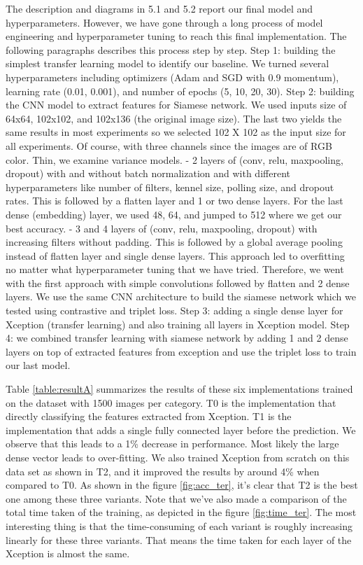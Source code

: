 The description and diagrams in 5.1 and 5.2 report our final model and hyperparameters. However, we have gone through a long process of model engineering and hyperparameter tuning to reach this final implementation. The following paragraphs describes this process step by step.
Step 1: building the simplest transfer learning model to identify our baseline. We turned several hyperparameters including optimizers (Adam and SGD with 0.9 momentum), learning rate (0.01, 0.001), and number of epochs (5, 10, 20, 30).
Step 2: building the CNN model to extract features for Siamese network. We used inputs size of 64x64, 102x102, and 102x136 (the original image size). The last two yields the same results in most experiments so we selected 102 X 102 as the input size for all experiments. Of course, with three channels since the images are of RGB color. Thin, we examine variance models.
- 2 layers of (conv, relu, maxpooling, dropout) with and without batch normalization and with different hyperparameters like number of filters, kennel size, polling size, and dropout rates. This is followed by a flatten layer and 1 or two dense layers. For the last dense (embedding) layer, we used 48, 64, and jumped to 512 where we get our best accuracy.
- 3 and 4 layers of (conv, relu, maxpooling, dropout) with increasing filters without padding. This is followed by a global average pooling instead of flatten layer and single dense layers. This approach led to overfitting no matter what hyperparameter tuning that we have tried.
Therefore, we went with the first approach with simple convolutions followed by flatten and 2 dense layers. We use the same CNN architecture to build the siamese network which we tested using contrastive and triplet loss.
Step 3: adding a single dense layer for Xception (transfer learning) and also training all layers in  Xception model.
Step 4: we combined transfer learning with siamese network by adding 1 and 2 dense layers on top of extracted features from exception and use the triplet loss to train our last model.

Table \ref{table:resultA}  summarizes the results of these six implementations trained on the dataset with 1500 images per category. T0 is the implementation that directly classifying the features extracted from Xception. T1 is the implementation that adds a single fully connected layer before the prediction. We observe that this leads to a 1\% decrease in performance. Most likely the large dense vector leads to over-fitting. We also trained Xception from scratch on this data set as shown in T2, and it improved the results by around 4\% when compared to T0. As shown in the figure \ref{fig:acc_ter}, it's clear that T2 is the best one among these three variants. Note that we've also made a comparison of the total time taken of the training, as depicted in the figure \ref{fig:time_ter}. The most interesting thing is that the time-consuming of each variant is roughly increasing linearly for these three variants. That means the time taken for each layer of the Xception is almost the same. 


